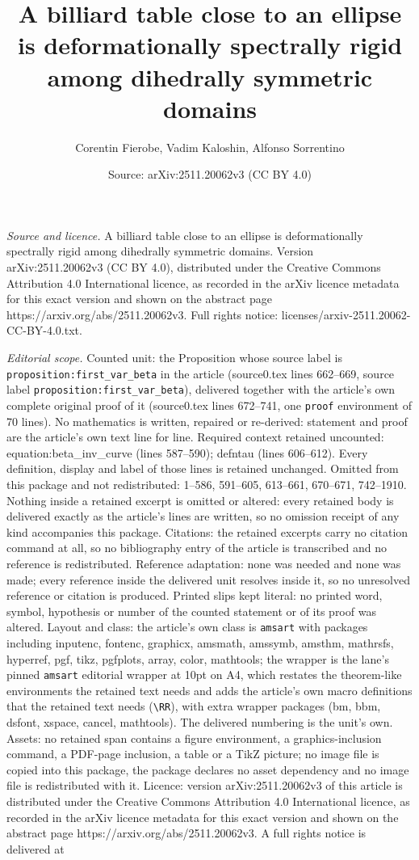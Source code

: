\documentclass[10pt,a4paper]{amsart}
\title[A billiard table close to an ellipse is deformationally spec]{A billiard table close to an ellipse is deformationally spectrally rigid among dihedrally symmetric domains}
\author{Corentin Fierobe, Vadim Kaloshin, Alfonso Sorrentino}
\date{Source: arXiv:2511.20062v3 (CC BY 4.0)}
\begin{document}
\maketitle

\noindent\emph{Source and licence.} A billiard table close to an ellipse is deformationally spectrally rigid among dihedrally symmetric domains. Version arXiv:2511.20062v3 (CC BY 4.0), distributed under the Creative Commons Attribution 4.0 International licence, as recorded in the arXiv licence metadata for this exact version and shown on the abstract page https://arxiv.org/abs/2511.20062v3. Full rights notice: licenses/arxiv-2511.20062-CC-BY-4.0.txt.\par\smallskip

\noindent\textit{Editorial scope.} Counted unit: the Proposition whose source label is \texttt{proposition:first\_var\_beta} in the article (source0.tex lines 662--669, source label \texttt{proposition:first\_var\_beta}), delivered together with the article's own complete original proof of it (source0.tex lines 672--741, one \texttt{proof} environment of 70 lines). No mathematics is written, repaired or re-derived: statement and proof are the article's own text line for line. Required context retained uncounted: equation:beta\_inv\_curve (lines 587--590); defntau (lines 606--612). Every definition, display and label of those lines is retained unchanged. Omitted from this package and not redistributed: 1--586, 591--605, 613--661, 670--671, 742--1910. Nothing inside a retained excerpt is omitted or altered: every retained body is delivered exactly as the article's lines are written, so no omission receipt of any kind accompanies this package. Citations: the retained excerpts carry no citation command at all, so no bibliography entry of the article is transcribed and no reference is redistributed. Reference adaptation: none was needed and none was made; every reference inside the delivered unit resolves inside it, so no unresolved reference or citation is produced. Printed slips kept literal: no printed word, symbol, hypothesis or number of the counted statement or of its proof was altered. Layout and class: the article's own class is \texttt{amsart} with packages including inputenc, fontenc, graphicx, amsmath, amssymb, amsthm, mathrsfs, hyperref, pgf, tikz, pgfplots, array, color, mathtools; the wrapper is the lane's pinned \texttt{amsart} editorial wrapper at 10pt on A4, which restates the theorem-like environments the retained text needs and adds the article's own macro definitions that the retained text needs (\texttt{\textbackslash RR}), with extra wrapper packages (bm, bbm, dsfont, xspace, cancel, mathtools). The delivered numbering is the unit's own. Assets: no retained span contains a figure environment, a graphics-inclusion command, a PDF-page inclusion, a table or a TikZ picture; no image file is copied into this package, the package declares no asset dependency and no image file is redistributed with it. Licence: version arXiv:2511.20062v3 of this article is distributed under the Creative Commons Attribution 4.0 International licence, as recorded in the arXiv licence metadata for this exact version and shown on the abstract page https://arxiv.org/abs/2511.20062v3. A full rights notice is delivered at 
\end{document}
